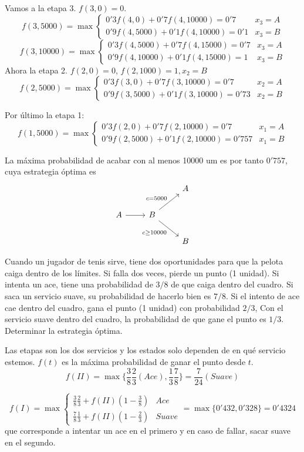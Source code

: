 \documentclass[twoside]{article}
\begin{document}
\begin{solucion}
\begin{enumerate}
Vamos a la etapa 3. $f(3,0)=0$. 
$$f(3,5000)=\max\begin{cases}
0'3f(4,0)+0'7f(4,10000)=0'7 & x_3=A\\
0'9f(4,5000)+0'1f(4,10000)=0'1 & x_3=B
\end{cases}$$
$$f(3,10000)=\max\begin{cases}
0'3f(4,5000)+0'7f(4,15000)=0'7 & x_3=A\\
0'9f(4,10000)+0'1f(4,15000)=1 & x_3=B
\end{cases}$$
Ahora la etapa 2. $f(2,0)=0$, $f(2,1000)=1, x_2=B$
$$f(2,5000)=\max\begin{cases}
0'3f(3,0)+0'7f(3,10000)=0'7 & x_2=A\\
0'9f(3,5000)+0'1f(3,10000)=0'73 & x_2=B
\end{cases}$$

Por último la etapa 1:
$$f(1,5000)=\max\begin{cases}
0'3f(2,0)+0'7f(2,10000)=0'7 & x_1=A\\
0'9f(2,5000)+0'1f(2,10000)=0'757 & x_1=B
\end{cases}$$

La máxima probabilidad de acabar con al menos 10000 um es por tanto $0'757$, cuya estrategia óptima es
\[
\begin{tikzcd}
&  & A\\
A\arrow[r] & B\arrow[ur,"c=5000"]\arrow[dr,"c\geq 10000"'] & \\
& & B
\end{tikzcd}
\]
\end{enumerate}
\end{solucion}


\newpage
\begin{ejercicio}{8} 
Cuando un jugador de tenis sirve, tiene dos oportunidades para que la pelota caiga dentro de los límites. Si falla dos veces, pierde un punto (1 unidad). Si intenta un ace, tiene una probabilidad de $3/8$ de que caiga dentro del cuadro. Si saca un servicio suave, su probabilidad de hacerlo bien es $7/8$. Si el intento de ace cae dentro del cuadro, gana el punto (1 unidad) con probabilidad $2/3$, Con el servicio suave dentro del cuadro, la probabilidad de que gane el punto es $1/3$. Determinar la estrategia óptima.
\end{ejercicio}
\begin{solucion}
Las etapas son los dos servicios y los estados solo dependen de en qué servicio estemos. $f(t)$ es la máxima probabilidad de ganar el punto desde $t$. 
$$f(II)=
\max\{\frac{3}{8}\frac{2}{3} (Ace),\frac{1}{3}\frac{7}{8}\}=\frac{7}{24}(Suave)
$$

$$f(I)=\max\begin{cases}
\frac{3}{8}\frac{2}{3}+f(II)(1-\frac{3}{8}) & Ace\\
\frac{7}{8}\frac{1}{3}+f(II)(1-\frac{2}{3}) & Suave
\end{cases}=\max\{0'432,0'328\}=0'4324$$ que corresponde a intentar un ace en el primero y en caso de fallar, sacar suave en el segundo.
\end{solucion}
\end{document}
